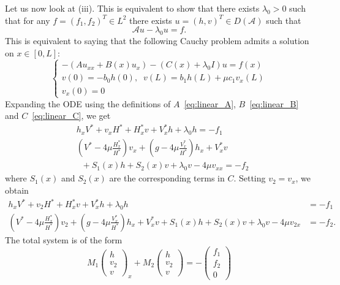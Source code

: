 \documentclass[11pt]{article}
\begin{document}
Let us now look at (iii). This is equivalent to show that there exists $\lambda_{0}>0$ such that for any $f=(f_{1},f_{2})^{T}\in L^{2}$ there exists $u=(h,v)^{T}\in D(\mathcal{A})$ such that
\begin{equation}
\mathcal{A}u - \lambda_0u = f.
\end{equation}
This is equivalent to saying that the following Cauchy problem admits a solution on $x \in [0, L]$:
\begin{equation}
\begin{cases}
-(A u_{xx} + B(x) u_x) - (C(x) + \lambda_0 I) u = f(x) \\
v(0) = -b_{0}h(0),\;\; v(L) = b_{1}h(L)+\mu c_{1}v_{x}(L) \\ v_{x}(0)=0
\end{cases}
\end{equation}
Expanding the ODE using the definitions of $A$~\eqref{eq:linear_A}, $B$~\eqref{eq:linear_B} and $C$~\eqref{eq:linear_C}, we get
\begin{equation}
\label{eq:wp1}
\begin{split}
&h_{x}V^{*}+v_{x}H^{*}+H_{x}^{*}v+V_{x}^{*}h+\lambda_{0} h = -f_{1}\\
&\left(V^{*}-4\mu\frac{H_x^{*}}{H^{*}}\right)v_{x}+\left(g-4\mu \frac{V_x^{*}}{H^{*}}\right)h_{x}+V^{*}_{x}v\\&\;\;+S_{1}(x)h+S_{2}(x)v +\lambda_{0}v-4\mu v_{xx} = -f_{2}
\end{split}
\end{equation}
where $S_1(x)$ and $S_2(x)$ are the corresponding terms in $C$. Setting $v_{2} = v_{x}$, we obtain
\begin{equation}
\begin{split}
h_{x}V^{*}+v_{2}H^{*}+H_{x}^{*}v+V_{x}^{*}h+\lambda_{0} h &= -f_{1}\\
\left(V^{*}-4\mu\frac{H_x^{*}}{H^{*}}\right)v_{2}+\left(g-4\mu \frac{V_x^{*}}{H^{*}}\right)h_{x}+V^{*}_{x}v +S_{1}(x)h+S_{2}(x)v +\lambda_{0}v-4\mu v_{2x} &= -f_{2}.
\end{split}
\end{equation}
{The total system} is of the form
\begin{equation}
\label{eq:wp2}
M_{1}\begin{pmatrix}h\\v_{2}\\v\end{pmatrix}_{x} + M_{2}\begin{pmatrix}h\\v_{2}\\v\end{pmatrix}= {-} \begin{pmatrix}f_{1}\\f_{2}\\0\end{pmatrix}
\end{equation}
\end{document}

